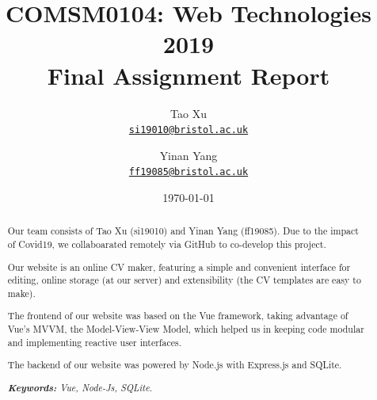 \documentclass[11pt]{article}
\title{COMSM0104: Web Technologies 2019 \\Final Assignment Report}
\author{Tao Xu\\%
	\href{mailto:si19010@bristol.ac.uk}{\texttt{si19010@bristol.ac.uk}} %
	\and Yinan Yang\\%
	\href{mailto:ff19085@bristol.ac.uk}{\texttt{ff19085@bristol.ac.uk}} %
}
\date{\today}
\begin{document}
	{
		\maketitle
		\begin{abstract}
			
			Our team consists of Tao Xu (si19010) and Yinan Yang (ff19085). Due to the impact of Covid19, we collaboarated remotely via GitHub to co-develop this project.
			
			Our website is an online CV maker, featuring a simple and convenient interface for editing, online storage (at our server) and extensibility (the CV templates are easy to make).
			
			The frontend of our website was based on the Vue framework, taking advantage of Vue's MVVM, the Model-View-View Model, which helped us in keeping code modular and implementing reactive user interfaces.
			
			The backend of our website was powered by Node.js with Express.js and SQLite.
			
			
			\noindent
			\textit{\textbf{Keywords: }%
				Vue, Node-Js, SQLite.} \\ %
			\noindent
			
		\end{abstract}
	}
	
\end{document}
